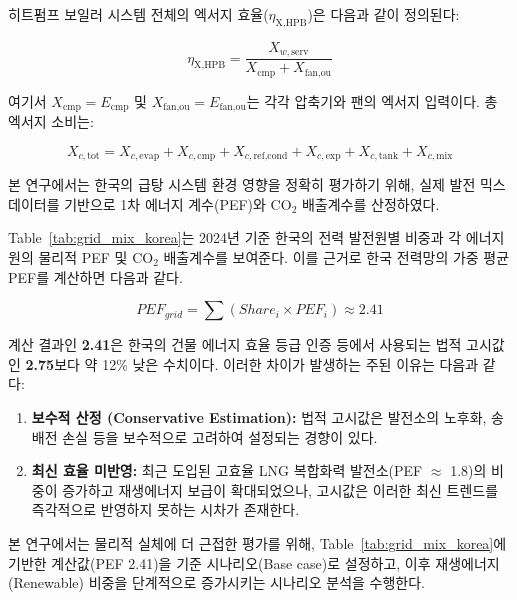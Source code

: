 \documentclass[final,5p,times,twocolumn,authoryear]{elsarticle}
\begin{document}
히트펌프 보일러 시스템 전체의 엑서지 효율($\eta_{\text{X,HPB}}$)은 다음과 같이 정의된다:



\begin{equation}
\label{eq:hpb_exergy_efficiency}
\eta_{\text{X,HPB}} = \frac{X_{w,\text{serv}}}{X_{\text{cmp}} + X_{\text{fan,ou}}}
\end{equation}

여기서 $X_{\text{cmp}} = E_{\text{cmp}}$ 및 $X_{\text{fan,ou}} = E_{\text{fan,ou}}$는 각각 압축기와 팬의 엑서지 입력이다. 총 엑서지 소비는:

\begin{equation}
\label{eq:hpb_xc_tot}
X_{c,\text{tot}} = X_{c,\text{evap}} + X_{c,\text{cmp}} + X_{c,\text{ref,cond}} + X_{c,\text{exp}} + X_{c,\text{tank}} + X_{c,\text{mix}}
\end{equation}





본 연구에서는 한국의 급탕 시스템 환경 영향을 정확히 평가하기 위해, 실제 발전 믹스 데이터를 기반으로 1차 에너지 계수(PEF)와 CO$_2$ 배출계수를 산정하였다.

Table~\ref{tab:grid_mix_korea}는 2024년 기준 한국의 전력 발전원별 비중과 각 에너지원의 물리적 PEF 및 CO$_2$ 배출계수를 보여준다. 이를 근거로 한국 전력망의 가중 평균 PEF를 계산하면 다음과 같다.

\begin{equation}
PEF_{grid} = \sum (Share_i \times PEF_i) \approx 2.41
\end{equation}

계산 결과인 \textbf{2.41}은 한국의 건물 에너지 효율 등급 인증 등에서 사용되는 법적 고시값인 \textbf{2.75}보다 약 12\% 낮은 수치이다. 이러한 차이가 발생하는 주된 이유는 다음과 같다:
\begin{enumerate}
    \item \textbf{보수적 산정 (Conservative Estimation):} 법적 고시값은 발전소의 노후화, 송배전 손실 등을 보수적으로 고려하여 설정되는 경향이 있다.
    \item \textbf{최신 효율 미반영:} 최근 도입된 고효율 LNG 복합화력 발전소(PEF $\approx$ 1.8)의 비중이 증가하고 재생에너지 보급이 확대되었으나, 고시값은 이러한 최신 트렌드를 즉각적으로 반영하지 못하는 시차가 존재한다.
\end{enumerate}

본 연구에서는 물리적 실체에 더 근접한 평가를 위해, Table~\ref{tab:grid_mix_korea}에 기반한 계산값(PEF 2.41)을 기준 시나리오(Base case)로 설정하고, 이후 재생에너지(Renewable) 비중을 단계적으로 증가시키는 시나리오 분석을 수행한다.
\end{document}
